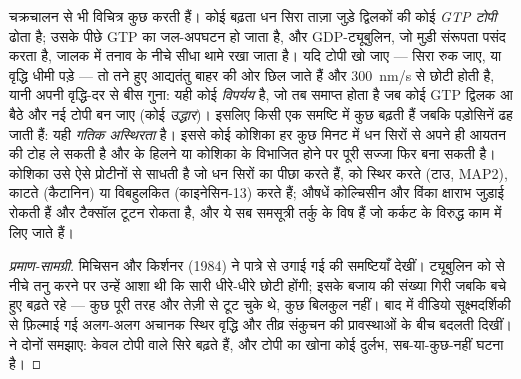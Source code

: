 \begin{definition}[गतिक अस्थिरता]\label{def:b3:cytoskeleton-motility:instability}
 चक्रचालन से भी विचित्र कुछ करती हैं। कोई बढ़ता धन
सिरा ताज़ा जुड़े द्विलकों की कोई \emph{GTP टोपी} ढोता है; उसके पीछे GTP
का जल-अपघटन हो जाता है, और GDP-ट्यूबुलिन, जो मुड़ी संरूपता पसंद करता है,
जालक में तनाव के नीचे सीधा थामे रखा जाता है। यदि टोपी खो जाए --- सिरा
रुक जाए, या वृद्धि धीमी पड़े --- तो तने हुए आद्यतंतु बाहर की ओर छिल जाते
हैं और  \qty{300}{nm/s} से छोटी होती है, यानी अपनी
वृद्धि-दर से बीस गुना: यही कोई \emph{विपर्यय} है, जो तब समाप्त होता है
जब कोई GTP द्विलक आ बैठे और नई टोपी बन जाए (कोई \emph{उद्धार})। इसलिए
किसी एक समष्टि में कुछ  बढ़ती हैं जबकि पड़ोसिनें ढह जाती
हैं: यही \emph{गतिक अस्थिरता} है। इससे कोई कोशिका हर कुछ मिनट में धन
सिरों से अपने ही आयतन की टोह ले सकती है और  के हिलने या कोशिका
के विभाजित होने पर पूरी सज्जा फिर बना सकती है। कोशिका उसे ऐसे प्रोटीनों
से साधती है जो धन सिरों का पीछा करते हैं,  को स्थिर करते
(टाउ, MAP2), काटते (कैटानिन) या विबहुलकित (काइनेसिन-13) करते हैं;
औषधें कोल्चिसीन और विंका क्षाराभ जुड़ाई रोकती हैं और टैक्सॉल टूटन
रोकता है, और ये सब समसूत्री तर्कु के विष हैं जो कर्कट के विरुद्ध काम
में लिए जाते हैं।
\end{definition}

\begin{proof}[प्रमाण-सामग्री]
मिचिसन और किर्शनर (1984) ने पात्रे  से उगाई गई
 की समष्टियाँ देखीं। ट्यूबुलिन को  से
नीचे तनु करने पर उन्हें आशा थी कि सारी  धीरे-धीरे छोटी
होंगी; इसके बजाय  की संख्या गिरी जबकि बचे हुए बढ़ते रहे
--- कुछ पूरी तरह और तेज़ी से टूट चुके थे, कुछ बिलकुल नहीं। बाद में
वीडियो सूक्ष्मदर्शिकी से फ़िल्माई गई अलग-अलग  अचानक
स्थिर वृद्धि और तीव्र संकुचन की प्रावस्थाओं के बीच बदलती दिखीं।
 ने दोनों समझाए: केवल टोपी वाले सिरे बढ़ते हैं, और टोपी का
खोना कोई दुर्लभ, सब-या-कुछ-नहीं घटना है।
\end{proof}

